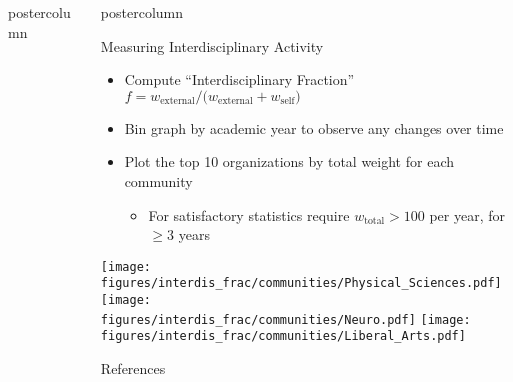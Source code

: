 \documentclass{beamer}
\newcommand{\includedir}{../latex_files}
\newcommand{\figures}{../outputs/plots}
\newlength{\columnheight}
\begin{document}
\begin{frame}
\begin{columns}
\begin{column}{.57\textwidth}
\begin{beamercolorbox}[center]{postercolumn}
\begin{minipage}{.98\textwidth}
{%
}\end{minipage}\end{beamercolorbox}
\end{column}

\begin{column}{.43\textwidth}
\begin{beamercolorbox}[center]{postercolumn}
\begin{minipage}{.98\textwidth}
\parbox[t][\columnheight]{\textwidth}{
  \begin{myblock}{Measuring Interdisciplinary Activity}
    \begin{itemize}
      \item Compute ``Interdisciplinary Fraction'' $f = w_{\text{external}} / \big(w_{\text{external}} + w_{\text{self}}\big)$
      \item Bin graph by academic year to observe any changes over time
      \item Plot the top 10 organizations by total weight for each community
      \begin{itemize}
        \item For satisfactory statistics require $w_{\text{total}} > 100$ per year, for $\geq 3$ years
      \end{itemize}
    \end{itemize}
    \vspace{0.8cm}
    \begin{center}
      \texttt{[image: \\figures/interdis\_frac/communities/Physical\_Sciences.pdf]}
      \vspace{0.41cm}
      \texttt{[image: \\figures/interdis\_frac/communities/Neuro.pdf]}
      \vspace{0.41cm}
      \texttt{[image: \\figures/interdis\_frac/communities/Liberal\_Arts.pdf]}
    \end{center}
  \end{myblock}\vfill


  \nocite{networkx}

  \begin{myblock}{References}
    
    {\footnotesize
      
    }
  \end{myblock}\vfill

}\end{minipage}\end{beamercolorbox}
\end{column}

\end{columns}
\end{frame}
\end{document}
